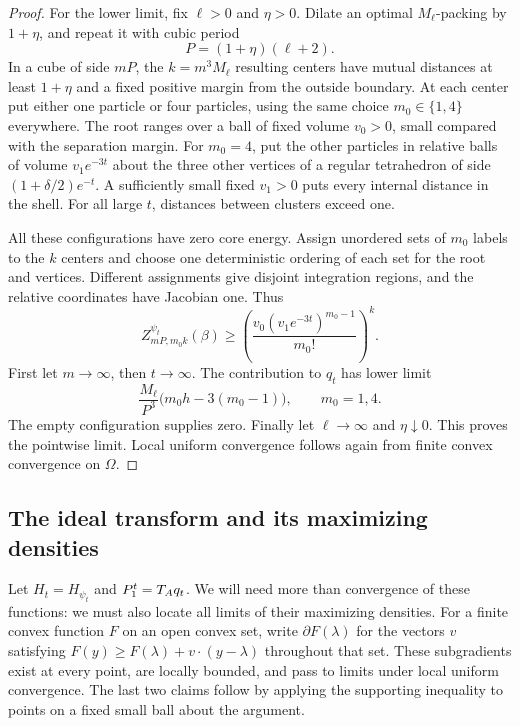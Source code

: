 \begin{proof}
For the lower limit, fix \(\ell>0\) and \(\eta>0\).  Dilate an optimal
\(M_\ell\)-packing by \(1+\eta\), and repeat it with cubic period
\[
 P=(1+\eta)(\ell+2).
\]
In a cube of side \(mP\), the \(k=m^3M_\ell\) resulting centers have
mutual distances at least \(1+\eta\) and a fixed positive margin
from the outside boundary.  At each center put either one particle
or four particles, using the same choice \(m_0\in\{1,4\}\) everywhere.
The root ranges over a ball of fixed volume \(v_0>0\), small compared
with the separation margin.  For \(m_0=4\), put the other particles
in relative balls of volume \(v_1e^{-3t}\) about the three other
vertices of a regular tetrahedron of side
\((1+\delta/2)e^{-t}\).  A sufficiently small fixed \(v_1>0\)
puts every internal distance in the shell.  For all large \(t\),
distances between clusters exceed one.

All these configurations have zero core energy.  Assign unordered
sets of \(m_0\) labels to the \(k\) centers and choose one deterministic
ordering of each set for the root and vertices.  Different assignments
give disjoint integration regions, and the relative coordinates have
Jacobian one.  Thus
\[
 Z_{mP,m_0k}^{\psi_t}(\beta)
 \ge
 \left(\frac{v_0(v_1e^{-3t})^{m_0-1}}{m_0!}\right)^k .
\]
First let \(m\to\infty\), then \(t\to\infty\).
The contribution to \(q_t\) has lower limit
\[
 \frac{M_\ell}{P^3}\bigl(m_0h-3(m_0-1)\bigr),
 \qquad m_0=1,4.
\]
The empty configuration supplies zero.  Finally let
\(\ell\to\infty\) and \(\eta\downarrow0\).
This proves the pointwise limit.  Local uniform convergence follows
again from finite convex convergence on \(\Omega\).
\end{proof}

\subsection{The ideal transform and its maximizing densities}

Let \(H_t=H_{\psi_t}\) and \(P_1^t=T_Aq_t\).
We will need more than convergence of these functions: we must also
locate all limits of their maximizing densities.
For a finite convex function \(F\) on an open convex set, write
\(\partial F(\lambda)\) for the vectors \(v\) satisfying
\(F(y)\ge F(\lambda)+v\cdot(y-\lambda)\) throughout that set.
These subgradients exist at every point, are locally bounded, and
pass to limits under local uniform convergence.  The last two
claims follow by applying the supporting inequality to points on
a fixed small ball about the argument.

